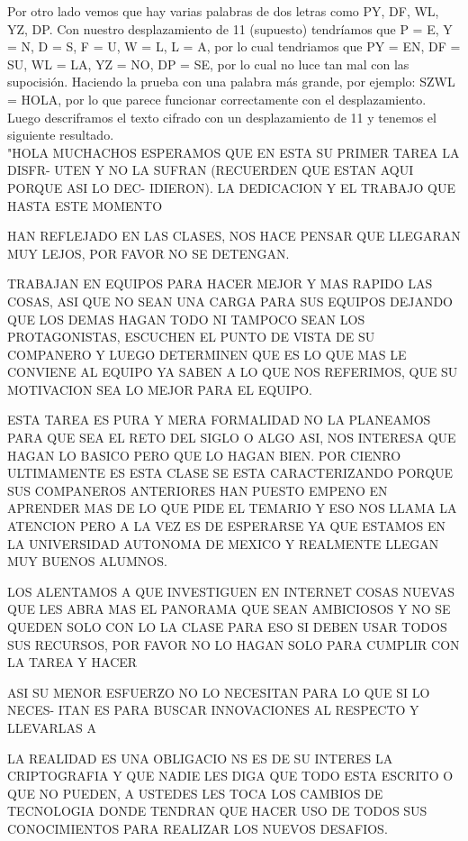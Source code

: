\documentclass[12pt, letterpaper]{article}
\begin{document}
Por otro lado vemos que hay varias palabras de dos letras como PY, DF, WL, YZ, DP. Con nuestro desplazamiento de 11 (supuesto) tendríamos que P = E, Y = N, D = S, F = U, W = L, L = A, por lo cual tendriamos que PY = EN, DF = SU, WL = LA, YZ = NO, DP = SE, por lo cual no luce tan mal con las supocisión. Haciendo la prueba con una palabra más grande, por ejemplo: SZWL = HOLA, por lo que parece funcionar correctamente con el desplazamiento. Luego descriframos el texto cifrado con un desplazamiento de 11 y tenemos el siguiente resultado.\\

"HOLA MUCHACHOS ESPERAMOS QUE EN ESTA SU PRIMER TAREA LA DISFR-
UTEN Y NO LA SUFRAN (RECUERDEN QUE ESTAN AQUI PORQUE ASI LO DEC-
IDIERON). LA DEDICACION Y EL TRABAJO QUE HASTA ESTE MOMENTO

HAN REFLEJADO EN LAS CLASES, NOS HACE PENSAR QUE LLEGARAN
MUY LEJOS, POR FAVOR NO SE DETENGAN.

TRABAJAN EN EQUIPOS PARA HACER MEJOR Y MAS RAPIDO LAS COSAS,
ASI QUE NO SEAN UNA CARGA PARA SUS EQUIPOS DEJANDO QUE LOS
DEMAS HAGAN TODO NI TAMPOCO SEAN LOS PROTAGONISTAS, ESCUCHEN
EL PUNTO DE VISTA DE SU COMPANERO Y LUEGO DETERMINEN QUE ES LO
QUE MAS LE CONVIENE AL EQUIPO YA SABEN A LO QUE NOS REFERIMOS,
QUE SU MOTIVACION SEA LO MEJOR PARA EL EQUIPO.

ESTA TAREA ES PURA Y MERA FORMALIDAD NO LA PLANEAMOS PARA QUE
SEA EL RETO DEL SIGLO O ALGO ASI, NOS INTERESA QUE HAGAN LO
BASICO PERO QUE LO HAGAN BIEN. POR CIENRO ULTIMAMENTE ES ESTA
CLASE SE ESTA CARACTERIZANDO PORQUE SUS COMPANEROS ANTERIORES
HAN PUESTO EMPENO EN APRENDER MAS DE LO QUE PIDE EL TEMARIO Y
ESO NOS LLAMA LA ATENCION PERO A LA VEZ ES DE ESPERARSE YA
QUE ESTAMOS EN LA UNIVERSIDAD AUTONOMA DE MEXICO Y REALMENTE
LLEGAN MUY BUENOS ALUMNOS.

LOS ALENTAMOS A QUE INVESTIGUEN EN INTERNET COSAS NUEVAS QUE
LES ABRA MAS EL PANORAMA QUE SEAN AMBICIOSOS Y NO SE QUEDEN
SOLO CON LO LA CLASE PARA ESO SI DEBEN USAR TODOS SUS RECURSOS,
POR FAVOR NO LO HAGAN SOLO PARA CUMPLIR CON LA TAREA Y HACER

ASI SU MENOR ESFUERZO NO LO NECESITAN PARA LO QUE SI LO NECES-
ITAN ES PARA BUSCAR INNOVACIONES AL RESPECTO Y LLEVARLAS A

LA REALIDAD ES UNA OBLIGACIO NS ES DE SU INTERES LA CRIPTOGRAFIA
Y QUE NADIE LES DIGA QUE TODO ESTA ESCRITO O QUE NO PUEDEN, A
USTEDES LES TOCA LOS CAMBIOS DE TECNOLOGIA DONDE TENDRAN
QUE HACER USO DE TODOS SUS CONOCIMIENTOS PARA REALIZAR LOS
NUEVOS DESAFIOS.
\end{document}
